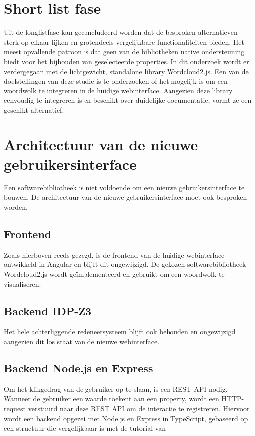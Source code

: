 \section {Short list fase}
Uit de longlistfase kan geconcludeerd worden dat de besproken alternatieven sterk op elkaar lijken en grotendeels vergelijkbare functionaliteiten bieden. Het meest opvallende patroon is dat geen van de bibliotheken native ondersteuning biedt voor het bijhouden van geselecteerde properties. In dit onderzoek wordt er verdergegaan met de lichtgewicht, standalone library Wordcloud2.js. Een van de doelstellingen van deze studie is te onderzoeken of het mogelijk is om een woordwolk te integreren in de huidige webinterface. Aangezien deze library eenvoudig te integreren is en beschikt over duidelijke documentatie, vormt ze een geschikt alternatief.

\section{Architectuur van de nieuwe gebruikersinterface}
Een softwarebibliotheek is niet voldoende om een nieuwe gebruikersinterface te bouwen. De architectuur van de nieuwe gebruikersinterface moet ook besproken worden.

\subsection{Frontend}
Zoals hierboven reeds gezegd, is de frontend van de huidige webinterface ontwikkeld in Angular en blijft dit ongewijzigd. De gekozen softwarebibliotheek Wordcloud2.js wordt geïmplementeerd en gebruikt om een woordwolk te visualiseren.

\subsection{Backend IDP-Z3}
Het hele achterliggende redeneersysteem blijft ook behouden en ongewijzigd aangezien dit los staat van de nieuwe webinterface.

\subsection{Backend Node.js en Express}
Om het klikgedrag van de gebruiker op te slaan, is een REST API nodig. Wanneer de gebruiker een waarde toekent aan een property, wordt een HTTP-request verstuurd naar deze REST API om de interactie te registreren. Hiervoor wordt een backend opgezet met Node.js en Express in TypeScript, gebaseerd op een structuur die vergelijkbaar is met de tutorial van~\textcite{Mallawaarachchi2023}.

